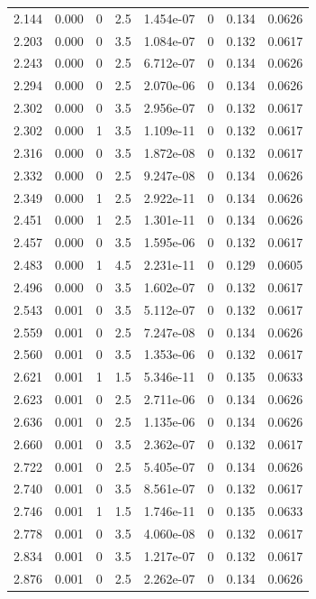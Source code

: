 \documentclass[preview]{standalone}
\begin{document}
{{{\begin{tabular}{L{1.2cm}C{1.2cm} C{0.3cm}C{0.5cm} C{1.4cm}C{1.4cm} C{1.4cm}C{1.4cm}}
  2.144  &  0.000  & 0     & 2.5 &  1.454e-07  & 0  & 0.134 &  0.0626   \\ 
  2.203  &  0.000  & 0     & 3.5 &  1.084e-07  & 0  & 0.132 &  0.0617   \\ 
  2.243  &  0.000  & 0     & 2.5 &  6.712e-07  & 0  & 0.134 &  0.0626   \\ 
  2.294  &  0.000  & 0     & 2.5 &  2.070e-06  & 0  & 0.134 &  0.0626   \\ 
  2.302  &  0.000  & 0     & 3.5 &  2.956e-07  & 0  & 0.132 &  0.0617   \\ 
  2.302  &  0.000  & 1     & 3.5 &  1.109e-11  & 0  & 0.132 &  0.0617   \\ 
  2.316  &  0.000  & 0     & 3.5 &  1.872e-08  & 0  & 0.132 &  0.0617   \\ 
  2.332  &  0.000  & 0     & 2.5 &  9.247e-08  & 0  & 0.134 &  0.0626   \\ 
  2.349  &  0.000  & 1     & 2.5 &  2.922e-11  & 0  & 0.134 &  0.0626   \\ 
  2.451  &  0.000  & 1     & 2.5 &  1.301e-11  & 0  & 0.134 &  0.0626   \\ 
  2.457  &  0.000  & 0     & 3.5 &  1.595e-06  & 0  & 0.132 &  0.0617   \\ 
  2.483  &  0.000  & 1     & 4.5 &  2.231e-11  & 0  & 0.129 &  0.0605   \\ 
  2.496  &  0.000  & 0     & 3.5 &  1.602e-07  & 0  & 0.132 &  0.0617   \\ 
  2.543  &  0.001  & 0     & 3.5 &  5.112e-07  & 0  & 0.132 &  0.0617   \\ 
  2.559  &  0.001  & 0     & 2.5 &  7.247e-08  & 0  & 0.134 &  0.0626   \\ 
  2.560  &  0.001  & 0     & 3.5 &  1.353e-06  & 0  & 0.132 &  0.0617   \\ 
  2.621  &  0.001  & 1     & 1.5 &  5.346e-11  & 0  & 0.135 &  0.0633   \\ 
  2.623  &  0.001  & 0     & 2.5 &  2.711e-06  & 0  & 0.134 &  0.0626   \\ 
  2.636  &  0.001  & 0     & 2.5 &  1.135e-06  & 0  & 0.134 &  0.0626   \\ 
  2.660  &  0.001  & 0     & 3.5 &  2.362e-07  & 0  & 0.132 &  0.0617   \\ 
  2.722  &  0.001  & 0     & 2.5 &  5.405e-07  & 0  & 0.134 &  0.0626   \\ 
  2.740  &  0.001  & 0     & 3.5 &  8.561e-07  & 0  & 0.132 &  0.0617   \\ 
  2.746  &  0.001  & 1     & 1.5 &  1.746e-11  & 0  & 0.135 &  0.0633   \\ 
  2.778  &  0.001  & 0     & 3.5 &  4.060e-08  & 0  & 0.132 &  0.0617   \\ 
  2.834  &  0.001  & 0     & 3.5 &  1.217e-07  & 0  & 0.132 &  0.0617   \\ 
  2.876  &  0.001  & 0     & 2.5 &  2.262e-07  & 0  & 0.134 &  0.0626   \\ 
\hline 
\end{tabular} 

}}}
\end{document}
